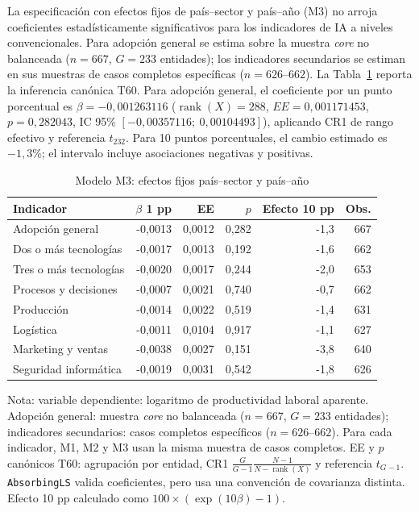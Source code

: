 \documentclass[12pt,a4paper]{article}
\begin{document}
La especificación con efectos fijos de país--sector y país--año (M3) no arroja coeficientes estadísticamente significativos para los indicadores de IA a niveles convencionales. Para adopción general se estima sobre la muestra \textit{core} no balanceada ($n=667$, $G=233$ entidades); los indicadores secundarios se estiman en sus muestras de casos completos específicas ($n=626\text{--}662$). La Tabla~\ref{tab:modelo-m3} reporta la inferencia canónica T60. Para adopción general, el coeficiente por un punto porcentual es $\beta=-0,001263116$ ($\operatorname{rank}(X)=288$, $EE=0,001171453$, $p=0,282043$, IC 95\% $[-0,00357116;\ 0,00104493]$), aplicando CR1 de rango efectivo y referencia $t_{232}$. Para 10 puntos porcentuales, el cambio estimado es $-1,3\%$; el intervalo incluye asociaciones negativas y positivas.

\begin{table}[H]
\centering
\caption{Modelo M3: efectos fijos país--sector y país--año}
\label{tab:modelo-m3}
\small
\begin{tabular}{lrrrrr}
\toprule
\textbf{Indicador} & \textbf{$\beta$ 1 pp} & \textbf{EE} & \textbf{$p$} & \textbf{Efecto 10 pp} & \textbf{Obs.} \\
\midrule
Adopción general & -0,0013 & 0,0012 & 0,282 & -1,3 & 667 \\
Dos o más tecnologías & -0,0017 & 0,0013 & 0,192 & -1,6 & 662 \\
Tres o más tecnologías & -0,0020 & 0,0017 & 0,244 & -2,0 & 653 \\
Procesos y decisiones & -0,0007 & 0,0021 & 0,740 & -0,7 & 662 \\
Producción & -0,0014 & 0,0022 & 0,519 & -1,4 & 631 \\
Logística & -0,0011 & 0,0104 & 0,917 & -1,1 & 627 \\
Marketing y ventas & -0,0038 & 0,0027 & 0,151 & -3,8 & 640 \\
Seguridad informática & -0,0019 & 0,0031 & 0,542 & -1,8 & 626 \\
\bottomrule
\end{tabular}
\begin{flushleft}
\footnotesize Nota: variable dependiente: logaritmo de productividad laboral aparente. Adopción general: muestra \textit{core} no balanceada ($n=667$, $G=233$ entidades); indicadores secundarios: casos completos específicos ($n=626\text{--}662$). Para cada indicador, M1, M2 y M3 usan la misma muestra de casos completos. EE y $p$ canónicos T60: agrupación por entidad, CR1 $\frac{G}{G-1}\frac{N-1}{N-\operatorname{rank}(X)}$ y referencia $t_{G-1}$. \texttt{AbsorbingLS} valida coeficientes, pero usa una convención de covarianza distinta. Efecto 10 pp calculado como $100\times(\exp(10\beta)-1)$.
\end{flushleft}
\end{table}
\end{document}
